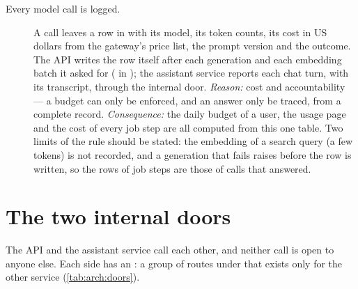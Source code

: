 \begin{description}
  \item[Every model call is logged.]
    A call leaves a row in  with its model, its token counts, its cost in US
    dollars from the gateway's price list, the prompt version and the outcome. The API
    writes the row itself after each generation and each embedding batch it asked for
    ( in ); the assistant service reports each
    chat turn, with its transcript, through the internal door. \emph{Reason:} cost and
    accountability --- a budget can only be enforced, and an answer only be traced, from a
    complete record. \emph{Consequence:} the daily budget of a user, the usage page and the
    cost of every job step are all computed from this one table. Two limits of the rule
    should be stated: the embedding of a search query (a few tokens) is not recorded, and a
    generation that fails raises before the row is written, so the rows of job steps are
    those of calls that answered.
\end{description}

\section{The two internal doors}\label{sec:arch:doors}

The API and the assistant service call each other, and neither call is open to anyone else.
Each side has an : a group of routes under  that exists
only for the other service (\cref{tab:arch:doors}).

